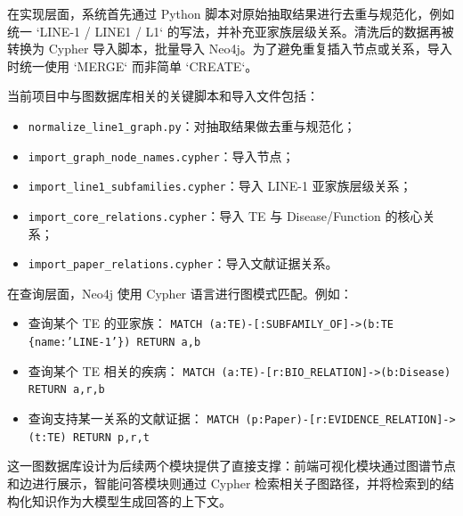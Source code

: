 在实现层面，系统首先通过 Python 脚本对原始抽取结果进行去重与规范化，例如统一 `LINE-1 / LINE1 / L1` 的写法，并补充亚家族层级关系。清洗后的数据再被转换为 Cypher 导入脚本，批量导入 Neo4j。为了避免重复插入节点或关系，导入时统一使用 `MERGE` 而非简单 `CREATE`。

当前项目中与图数据库相关的关键脚本和导入文件包括：
\begin{itemize}[leftmargin=2em]
  \item \texttt{normalize\_line1\_graph.py}：对抽取结果做去重与规范化；
  \item \texttt{import\_graph\_node\_names.cypher}：导入节点；
  \item \texttt{import\_line1\_subfamilies.cypher}：导入 LINE-1 亚家族层级关系；
  \item \texttt{import\_core\_relations.cypher}：导入 TE 与 Disease/Function 的核心关系；
  \item \texttt{import\_paper\_relations.cypher}：导入文献证据关系。
\end{itemize}

在查询层面，Neo4j 使用 Cypher 语言进行图模式匹配。例如：

\begin{itemize}[leftmargin=2em]
  \item 查询某个 TE 的亚家族：
  \texttt{MATCH (a:TE)-[:SUBFAMILY\_OF]->(b:TE \{name:'LINE-1'\}) RETURN a,b}
  \item 查询某个 TE 相关的疾病：
  \texttt{MATCH (a:TE)-[r:BIO\_RELATION]->(b:Disease) RETURN a,r,b}
  \item 查询支持某一关系的文献证据：
  \texttt{MATCH (p:Paper)-[r:EVIDENCE\_RELATION]->(t:TE) RETURN p,r,t}
\end{itemize}

这一图数据库设计为后续两个模块提供了直接支撑：前端可视化模块通过图谱节点和边进行展示，智能问答模块则通过 Cypher 检索相关子图路径，并将检索到的结构化知识作为大模型生成回答的上下文。
